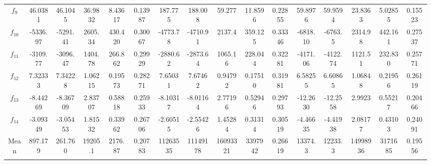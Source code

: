 \documentclass[paper=a4, fontsize=11pt]{scrartcl} %
\numberwithin{equation}{section} %
\numberwithin{figure}{section} %
\numberwithin{table}{section} %
\begin{document}
\begin{landscape}
\begin{table}
\begin{tabular}{c|ccccc|ccccc|ccccc}
			$f_{9}$  &  46.0381 &  46.1045 & 36.9832 & 8.43617 & 0.13987 &  187.775 &  188.008 & 59.277  & 11.8596 & 0.22855 &  59.8976 &  59.9594 & 23.8363 & 5.02855 & 0.15523\\
			$f_{10}$ & -5336.97 & -5291.41 & 2605.34 & 430.420 & 0.30067 & -4773.78 & -4710.91 & 2137.4  & 359.125 & 0.33346 & -6818.10 & -6763.5  & 2314.98 & 442.161 & 0.27537\\
			$f_{11}$ & -3109.77 & -3096.47 & 1404.78 & 266.862 & 0.29929 & -2880.62 & -2873.64 & 1065.16 & 228.044 & 0.32281 & -4171.06 & -4122.74 & 1121.51 & 232.830 & 0.25771\\
			$f_{12}$ &  7.32333 &  7.34228 & 1.06215 & 0.19573 & 0.28271 &  7.65031 &  7.67462 & 0.94792 & 0.17510 & 0.31981 &  6.58255 &  6.60865 & 1.06848 & 0.21956 & 0.26119\\
			$f_{13}$ & -8.44269 & -8.36709 & 2.83707 & 0.58818 & 0.25933 & -8.10317 & -8.01164 & 2.77196 & 0.52946 & 0.29793 & -12.2630 & -12.2558 & 2.9923  & 0.55217 & 0.20466\\
			$f_{14}$ & -3.09349 & -3.05453 & 1.81532 & 0.33962 & 0.26706 & -2.60515 & -2.55426 & 1.45284 & 0.31314 & 0.30519 & -4.46635 & -4.41938 & 2.08177 & 0.43103 & 0.24091\\
			
			\noalign{\smallskip}\hline\noalign{\smallskip}
			Mean & 897.179 & 261.760 & 19205.1 & 2176.87 & 0.20783 & 11263535 & 11149178 & 16093321 & 3397942 & 0.26619 & 13374.3 & 12233.3 & 14998936 & 3171685 & 0.19556\\
			\noalign{\smallskip}\hline\noalign{\smallskip}
			\multicolumn{16}{l}{\tiny $^1$ 3.2GHz AMD Ryzen 7 1700X, 16 GB RAM}
		\end{tabular}\label{DE_20}
	\end{table}
\end{landscape}

\pagebreak
\end{document}
